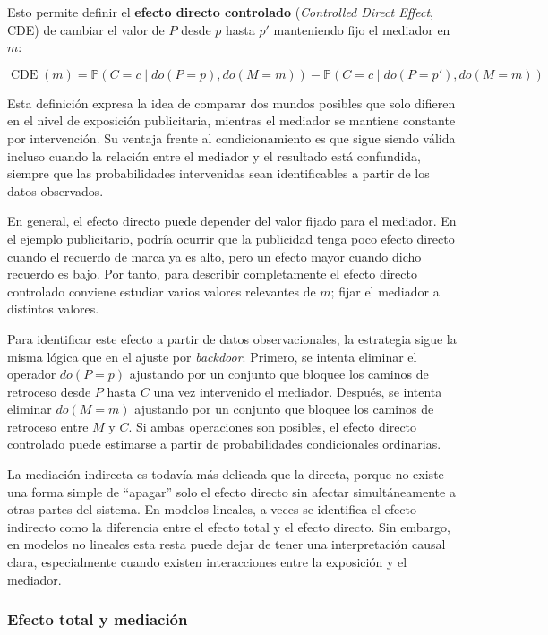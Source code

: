 \documentclass[12pt]{report} %
\begin{document}
Esto permite definir el \textbf{efecto directo controlado} (\textit{Controlled Direct Effect}, CDE) de cambiar el valor de $P$ desde $p$ hasta $p'$ manteniendo fijo el mediador en $m$:

\begin{equation}
    \operatorname{CDE}(m)
    = \mathbb{P}(C = c \mid do(P=p), do(M=m))
    - \mathbb{P}(C = c \mid do(P=p'), do(M=m))
    \label{eq:cde_publicidad}
\end{equation}

Esta definición expresa la idea de comparar dos mundos posibles que solo difieren en el nivel de exposición publicitaria, mientras el mediador se mantiene constante por intervención. Su ventaja frente al condicionamiento es que sigue siendo válida incluso cuando la relación entre el mediador y el resultado está confundida, siempre que las probabilidades intervenidas sean identificables a partir de los datos observados.

En general, el efecto directo puede depender del valor fijado para el mediador. En el ejemplo publicitario, podría ocurrir que la publicidad tenga poco efecto directo cuando el recuerdo de marca ya es alto, pero un efecto mayor cuando dicho recuerdo es bajo. Por tanto, para describir completamente el efecto directo controlado conviene estudiar varios valores relevantes de $m$; fijar el mediador a distintos valores.

Para identificar este efecto a partir de datos observacionales, la estrategia sigue la misma lógica que en el ajuste por \textit{backdoor}. Primero, se intenta eliminar el operador $do(P=p)$ ajustando por un conjunto que bloquee los caminos de retroceso desde $P$ hasta $C$ una vez intervenido el mediador. Después, se intenta eliminar $do(M=m)$ ajustando por un conjunto que bloquee los caminos de retroceso entre $M$ y $C$. Si ambas operaciones son posibles, el efecto directo controlado puede estimarse a partir de probabilidades condicionales ordinarias.

La mediación indirecta es todavía más delicada que la directa, porque no existe una forma simple de ``apagar'' solo el efecto directo sin afectar simultáneamente a otras partes del sistema. En modelos lineales, a veces se identifica el efecto indirecto como la diferencia entre el efecto total y el efecto directo. Sin embargo, en modelos no lineales esta resta puede dejar de tener una interpretación causal clara, especialmente cuando existen interacciones entre la exposición y el mediador.

\subsubsection{Efecto total y mediación}
\end{document}
